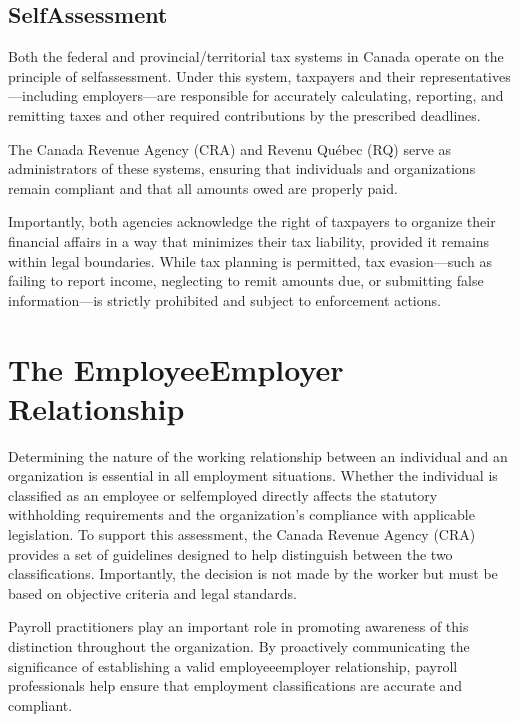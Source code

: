 \documentclass[letterpaper,10pt,english]{sphinxmanual}
\begin{document}
\subsection{Self\sphinxhyphen{}Assessment}
\label{\detokenize{compliance:self-assessment}}
\sphinxAtStartPar
Both the federal and provincial/territorial tax systems in Canada operate on the principle of self\sphinxhyphen{}assessment. Under this system, taxpayers and their representatives—including employers—are responsible for accurately calculating, reporting, and remitting taxes and other required contributions by the prescribed deadlines.

\sphinxAtStartPar
The Canada Revenue Agency (CRA) and Revenu Québec (RQ) serve as administrators of these systems, ensuring that individuals and organizations remain compliant and that all amounts owed are properly paid.

\sphinxAtStartPar
Importantly, both agencies acknowledge the right of taxpayers to organize their financial affairs in a way that minimizes their tax liability, provided it remains within legal boundaries. While tax planning is permitted, tax evasion—such as failing to report income, neglecting to remit amounts due, or submitting false information—is strictly prohibited and subject to enforcement actions.


\section{The Employee\sphinxhyphen{}Employer Relationship}
\label{\detokenize{compliance:the-employee-employer-relationship}}
\sphinxAtStartPar
Determining the nature of the working relationship between an individual and an organization is essential in all employment situations. Whether the individual is classified as an employee or self\sphinxhyphen{}employed directly affects the statutory withholding requirements and the organization’s compliance with applicable legislation. To support this assessment, the Canada Revenue Agency (CRA) provides a set of guidelines designed to help distinguish between the two classifications. Importantly, the decision is not made by the worker but must be based on objective criteria and legal standards.

\sphinxAtStartPar
Payroll practitioners play an important role in promoting awareness of this distinction throughout the organization. By proactively communicating the significance of establishing a valid employee\sphinxhyphen{}employer relationship, payroll professionals help ensure that employment classifications are accurate and compliant.
\end{document}
